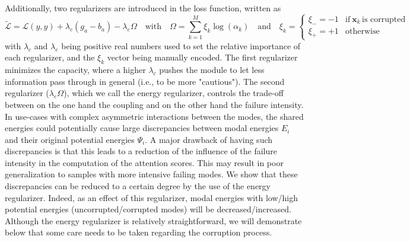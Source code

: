 Additionally, two regularizers are introduced in the loss function, written as
\begin{equation}
\tilde{\mathcal{L}} = \mathcal{L}(y,\hat{y}) + \lambda_c(g_a-b_a) - \lambda_e \Omega \quad \text{with} \quad \Omega = \sum_{k=1}^M \xi_k \log(\alpha_k) \quad \text{and} \quad \xi_k = \begin{cases}
      \xi_- = -1 & \text{if}\ \mathbf{x}_k\, \text{is corrupted} \\
      \xi_+ = +1 & \text{otherwise}
    \end{cases}
\label{eq:regularization}
\end{equation}
with $\lambda_c$ and $\lambda_e$ being positive real numbers used to set the relative importance of each regularizer, and the $\xi_k$ vector being manually encoded. The first regularizer minimizes the capacity, where a higher $\lambda_c$ pushes the module to let less information pass through in general (i.e., to be more "cautious"). The second regularizer ($\lambda_e \Omega$), which we call the energy regularizer, controls the trade-off between on the one hand the coupling and on the other hand the failure intensity. In use-cases with complex asymmetric interactions between the modes, the shared energies could potentially cause large discrepancies between modal energies $E_i$ and their original potential energies $\Psi_i$. A major drawback of having such discrepancies is that this leads to a reduction of the influence of the failure intensity in the computation of the attention scores. This may result in poor generalization to samples with more intensive failing modes. We show that these discrepancies can be reduced to a certain degree by the use of the energy regularizer. Indeed, as an effect of this regularizer, modal energies with low/high potential energies (uncorrupted/corrupted modes) will be decreased/increased. Although the energy regularizer is relatively straightforward, we will demonstrate below that some care needs to be taken regarding the corruption process.

